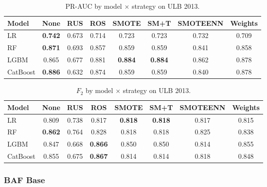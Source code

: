 \begin{table}[ht]
\centering
\caption{PR-AUC by model $\times$ strategy on ULB 2013.}
\label{tab:factorial_ulb_prauc}
\begin{tabular}{l c c c c c c c}
\toprule
Model & None & RUS & ROS & SMOTE & SM+T & SMOTEENN & Weights \\
\midrule
LR         & \textbf{0.742} & 0.673 & 0.714 & 0.723 & 0.723 & 0.732 & 0.709 \\
RF         & \textbf{0.871} & 0.693 & 0.857 & 0.859 & 0.859 & 0.841 & 0.858 \\
LGBM       & 0.865 & 0.677 & 0.881 & \textbf{0.884} & \textbf{0.884} & 0.862 & 0.878 \\
CatBoost   & \textbf{0.886} & 0.632 & 0.874 & 0.859 & 0.859 & 0.840 & 0.878 \\
\bottomrule
\end{tabular}
\end{table}

\begin{table}[ht]
\centering
\caption{$F_2$ by model $\times$ strategy on ULB 2013.}
\label{tab:factorial_ulb_f2}
\begin{tabular}{l c c c c c c c}
\toprule
Model & None & RUS & ROS & SMOTE & SM+T & SMOTEENN & Weights \\
\midrule
LR         & 0.809 & 0.738 & 0.817 & \textbf{0.818} & \textbf{0.818} & 0.817 & 0.815 \\
RF         & \textbf{0.862} & 0.764 & 0.828 & 0.818 & 0.818 & 0.825 & 0.838 \\
LGBM       & 0.847 & 0.668 & \textbf{0.866} & 0.850 & 0.850 & 0.814 & 0.855 \\
CatBoost   & 0.855 & 0.675 & \textbf{0.867} & 0.814 & 0.814 & 0.818 & 0.848 \\
\bottomrule
\end{tabular}
\end{table}


\subsubsection{BAF Base}

